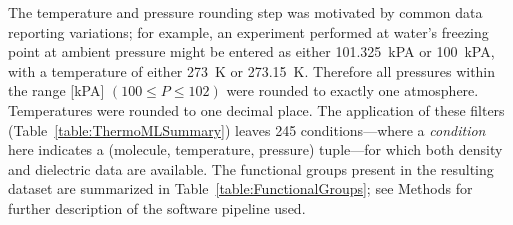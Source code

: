 \documentclass[aps,pre,twocolumn,nofootinbib,superscriptaddress,linenumbers]{revtex4-1}
\begin{document}
The temperature and pressure rounding step was motivated by common data reporting variations; for example, an experiment performed at water's freezing point at ambient pressure might be entered as either 101.325~kPA or 100~kPA, with a temperature of either 273~K or 273.15~K.  
Therefore all pressures within the range [kPA] $(100 \le P \le 102)$ were rounded to exactly one atmosphere.  
Temperatures were rounded to one decimal place. 
The application of these filters (Table~\ref{table:ThermoMLSummary}) leaves 245 conditions---where a \emph{condition} here indicates a (molecule, temperature, pressure) tuple---for which both density and dielectric data are available.  
The functional groups present in the resulting dataset are summarized in Table~\ref{table:FunctionalGroups}; see Methods for further description of the software pipeline used.  


\end{document}

